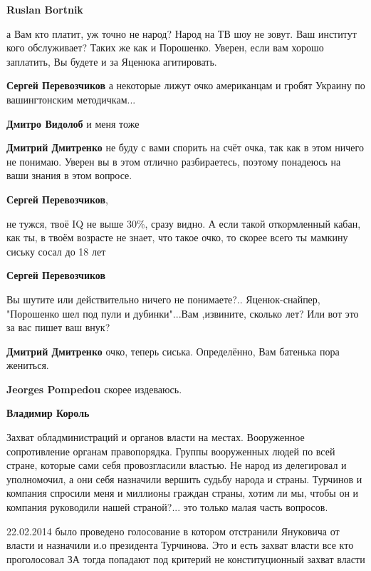\begin{itemize}
\begin{itemize}
\textbf{Ruslan Bortnik} 

а Вам кто платит, уж точно не народ? Народ на ТВ шоу не зовут. Ваш институт
кого обслуживает? Таких же как и Порошенко. Уверен, если вам хорошо заплатить,
Вы будете и за Яценюка агитировать.


\textbf{Сергей Перевозчиков} а некоторые лижут очко американцам и гробят Украину по вашингтонским методичкам...

\textbf{Дмитро Видолоб} и меня тоже

\textbf{Дмитрий Дмитренко} не буду с вами спорить на счёт очка, так как в этом ничего не понимаю. Уверен вы в этом отлично разбираетесь, поэтому понадеюсь на ваши знания в этом вопросе.

\textbf{Сергей Перевозчиков}, 

не тужся, твоё IQ не выше 30\%, сразу видно. А если такой откормленный кабан,
как ты, в твоём возрасте не знает, что такое очко, то скорее всего ты мамкину
сиську сосал до 18 лет


\textbf{Сергей Перевозчиков} 

Вы шутите или действительно ничего не понимаете?.. Яценюк-снайпер, "Порошенко шел
под пули и дубинки"...Вам ,извините, сколько лет? Или вот это за вас пишет ваш
внук?


\textbf{Дмитрий Дмитренко} очко, теперь сиська. Определённо, Вам батенька пора жениться.

\textbf{Jeorges Pompedou} скорее издеваюсь.

\textbf{Владимир Король} 

Захват обладминистраций и органов власти на местах. Вооруженное сопротивление
органам правопорядка. Группы вооруженных людей по всей стране, которые сами себя
провозгласили властью. Не народ из делегировал и уполномочил, а они себя
назначили вершить судьбу народа и страны. Турчинов и компания спросили меня и
миллионы граждан страны, хотим ли мы, чтобы он и компания руководили нашей
страной?... это только малая часть вопросов.



22.02.2014 было проведено голосование в котором отстранили Януковича от власти
и назначили и.о президента Турчинова. Это и есть захват власти все кто
проголосовал ЗА тогда попадают под критерий не конституционный захват власти


\end{itemize}
\end{itemize}
